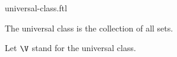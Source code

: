 \documentclass{naproche-library}
\begin{document}
\begin{smodule}[title=The Universal Class]{universal-class.ftl}

\begin{definition}[forthel,id=FOUNDATIONS_10_9625487120366325]
  The universal class is the collection of all sets.

  Let $\V$ stand for the universal class.
\end{definition}
\end{smodule}
\end{document}
